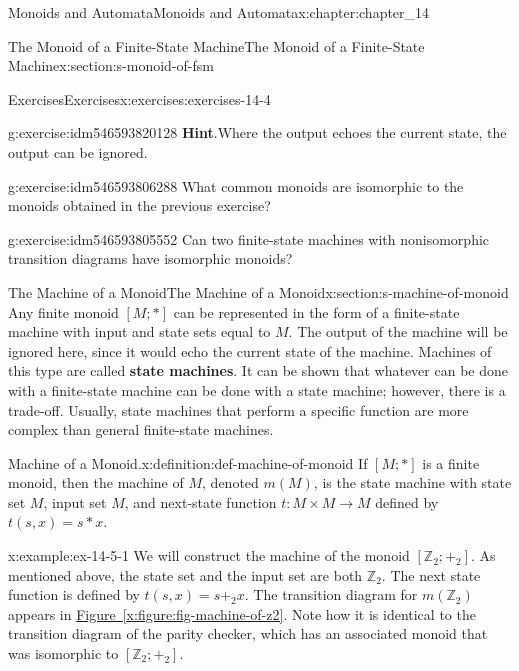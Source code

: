\documentclass[oneside,10pt,]{book}
\newcommand{\blocktitlefont}{\relax}
\newcommand{\xreffont}{\relax}
\newcommand{\terminology}[1]{\textbf{#1}}
\numberwithin{equation}{section}
\begin{document}
\begin{chapterptx}{Monoids and Automata}{}{Monoids and Automata}{}{}{x:chapter:chapter_14}
\begin{sectionptx}{The Monoid of a Finite-State Machine}{}{The Monoid of a Finite-State Machine}{}{}{x:section:s-monoid-of-fsm}
\begin{exercises-subsection}{Exercises}{}{Exercises}{}{}{x:exercises:exercises-14-4}
\begin{divisionexercise}{1}{}{}{g:exercise:idm546593820128}
\noindent\textbf{\blocktitlefont Hint}.\hypertarget{g:hint:idm546593816688}{}\quad{}Where the output echoes the current state, the output can be ignored.%
\end{divisionexercise}%
\begin{divisionexercise}{2}{}{}{g:exercise:idm546593806288}%
What common monoids are isomorphic to the monoids obtained in the previous exercise?%
\end{divisionexercise}%
\begin{divisionexercise}{3}{}{}{g:exercise:idm546593805552}%
Can two finite-state machines with nonisomorphic transition diagrams have isomorphic monoids?%
\end{divisionexercise}%
\end{exercises-subsection}
\end{sectionptx}
%
%
\typeout{************************************************}
\typeout{************************************************}
%
\begin{sectionptx}{The Machine of a Monoid}{}{The Machine of a Monoid}{}{}{x:section:s-machine-of-monoid}
%
Any finite monoid \([M;*]\) can be represented in the form of a finite-state machine with input and state sets equal to \(M\). The output of the machine will be ignored here, since it would echo the current state of the machine. Machines of this type are called \terminology{state machines}. It can be shown that whatever can be done with a finite-state machine can be done with a state machine; however, there is a trade-off. Usually, state machines that perform a specific function are more complex than general finite-state machines.%
\begin{definition}{Machine of a Monoid.}{x:definition:def-machine-of-monoid}%
%
\label{g:notation:idm546593797152}%
If \([M;*]\) is a finite monoid, then the machine of \(M\), denoted \(m(M)\), is the state machine with state set \(M\), input set \(M\), and next-state function \(t : M\times M \to M\) defined by  \(t(s, x) = s * x\).%
\end{definition}
\begin{example}{}{x:example:ex-14-5-1}%
We will construct the machine of the monoid \(\left[\mathbb{Z}_2;+_2\right]\). As mentioned above, the state set and the input set are both \(\mathbb{Z}_2\). The next state function is defined by \(t(s, x) = s +_2 x\). The transition diagram for \(m\left(\mathbb{Z}_2\right)\) appears in \hyperref[x:figure:fig-machine-of-z2]{Figure~{\xreffont\ref{x:figure:fig-machine-of-z2}}}. Note how it is identical to the transition diagram of the parity checker, which has an associated monoid that was isomorphic to \(\left[\mathbb{Z}_2;+_2\right].\)%

\end{example}
\end{sectionptx}
\end{chapterptx}
\end{document}
